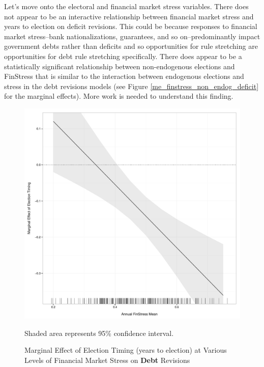 \documentclass[]{article}
\begin{document}
Let's move onto the electoral and financial market stress variables. There does not appear to be an interactive relationship between financial market stress and years to election on deficit revisions. This could be because responses to financial market stress--bank nationalizations, guarantees, and so on--predominantly impact government debts rather than deficits and so opportunities for rule stretching are opportunities for debt rule stretching specifically. There does appear to be a statistically significant relationship between non-endogenous elections and FinStress that is similar to the interaction between endogenous elections and stress in the debt revisions models (see Figure \ref{me_finstress_non_endog_deficit} for the marginal effects). More work is needed to understand this finding.

\begin{landscape}
    
\end{landscape}

\begin{landscape}
    
\end{landscape}


\begin{figure}
    \caption{Marginal Effect of Election Timing (years to election) at Various Levels of Financial Market Stress on \textbf{Debt} Revisions}
    \label{me_finstress_elect}

    \begin{center}
        \includegraphics[scale=0.4]{figures/finstress_elect_me.pdf}
    \end{center}

	{\scriptsize{Shaded area represents 95\% confidence interval.}}

\end{figure}
\end{document}
